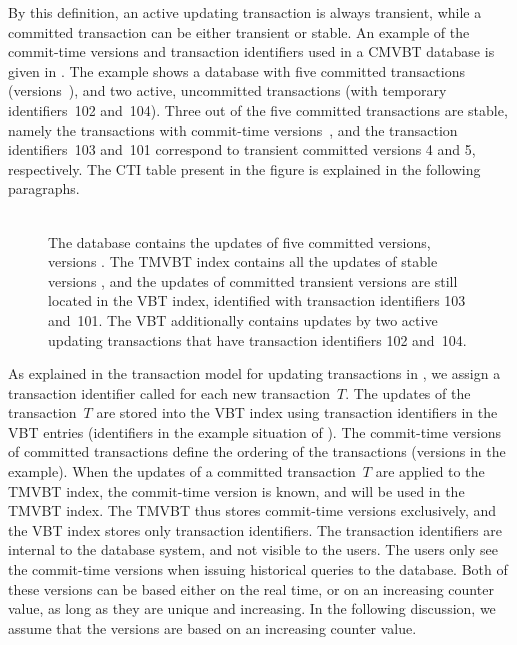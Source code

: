 By this definition, an active updating transaction is always transient,
while a committed transaction can be either transient or stable.
An example of the commit-time versions and transaction identifiers used in
a CMVBT database is given in \@.
The example shows a database with five committed transactions
(versions~), and two active, uncommitted transactions (with
temporary identifiers~\num{102} and~\num{104}).
Three out of the five committed transactions are stable, namely the
transactions with commit-time versions~, and 
the transaction identifiers~\num{103} and~\num{101} correspond to
transient committed versions \num{4} and \num{5}, respectively. 
The CTI table present in the figure is explained in the following
paragraphs.

\begin{figure}[htb]
\begin{center}
  \\
  {The database contains the updates of five committed versions, versions
  . 
  The TMVBT index contains all the updates of stable versions
  , and the updates of committed transient versions 
  are still located in the VBT index, identified with transaction
  identifiers \num{103} and~\num{101}.
  The VBT additionally contains updates by two active updating transactions
  that have transaction identifiers \num{102} and~\num{104}.}
  \label{fig:cmvbt-example}
\end{center}
\end{figure}

As explained in the transaction model for updating transactions in
, we assign a transaction identifier
called  for each new transaction~$T$\@.
The updates of the transaction~$T$ are stored into the VBT index using
transaction identifiers in the VBT entries (identifiers
 in the example situation of ). 
The commit-time versions  of committed transactions define
the ordering of the transactions (versions  in the example). 
When the updates of a committed transaction~$T$ are applied to the TMVBT
index, the commit-time version is known, and will be used in the TMVBT index.
The TMVBT thus stores commit-time versions exclusively, and the VBT
index stores only transaction identifiers.
The transaction identifiers are internal to the database system, and not
visible to the users.
The users only see the commit-time versions when issuing historical
queries to the database.
Both of these versions can be based either on the real time, or on
an increasing counter value, as long as they are unique and increasing. 
In the following discussion, we assume that the versions are based on
an increasing counter value.

